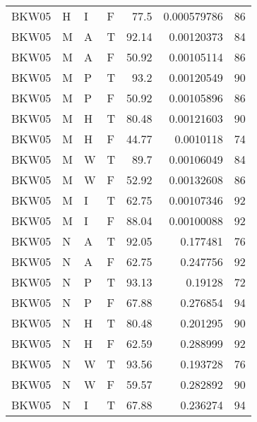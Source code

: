 \begin{longtable}{llllrrr}
    BKW05    & H         & I         & F          & 77.5       & 0.000579786 & 86       \\
    BKW05    & M         & A         & T          & 92.14      & 0.00120373  & 84       \\
    BKW05    & M         & A         & F          & 50.92      & 0.00105114  & 86       \\
    BKW05    & M         & P         & T          & 93.2       & 0.00120549  & 90       \\
    BKW05    & M         & P         & F          & 50.92      & 0.00105896  & 86       \\
    BKW05    & M         & H         & T          & 80.48      & 0.00121603  & 90       \\
    BKW05    & M         & H         & F          & 44.77      & 0.0010118   & 74       \\
    BKW05    & M         & W         & T          & 89.7       & 0.00106049  & 84       \\
    BKW05    & M         & W         & F          & 52.92      & 0.00132608  & 86       \\
    BKW05    & M         & I         & T          & 62.75      & 0.00107346  & 92       \\
    BKW05    & M         & I         & F          & 88.04      & 0.00100088  & 92       \\
    BKW05    & N         & A         & T          & 92.05      & 0.177481    & 76       \\
    BKW05    & N         & A         & F          & 62.75      & 0.247756    & 92       \\
    BKW05    & N         & P         & T          & 93.13      & 0.19128     & 72       \\
    BKW05    & N         & P         & F          & 67.88      & 0.276854    & 94       \\
    BKW05    & N         & H         & T          & 80.48      & 0.201295    & 90       \\
    BKW05    & N         & H         & F          & 62.59      & 0.288999    & 92       \\
    BKW05    & N         & W         & T          & 93.56      & 0.193728    & 76       \\
    BKW05    & N         & W         & F          & 59.57      & 0.282892    & 90       \\
    BKW05    & N         & I         & T          & 67.88      & 0.236274    & 94       \\

\end{longtable}
